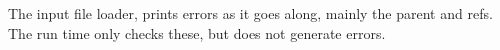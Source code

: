 The input file loader, prints errors as it goes along, mainly the parent
and refs. The run time only checks these, but does not generate errors.
